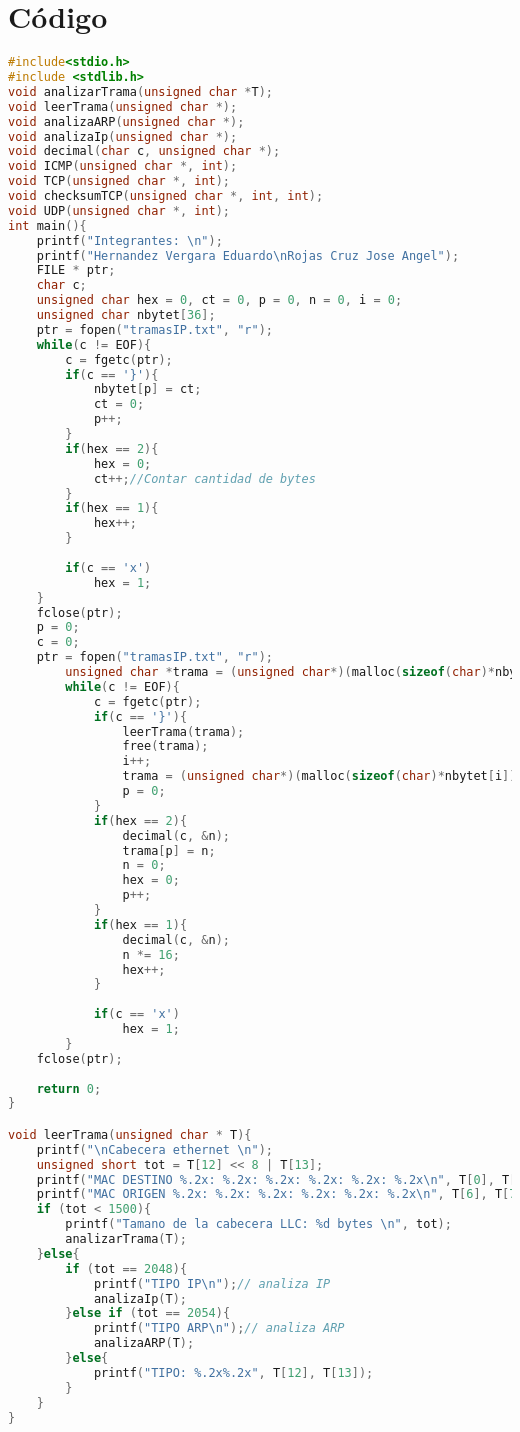 \section{C\'odigo}
	\begin{lstlisting}[language={C}, caption={Analizador de tramas en C}, label={Script}]
#include<stdio.h>
#include <stdlib.h>
void analizarTrama(unsigned char *T);
void leerTrama(unsigned char *);
void analizaARP(unsigned char *);
void analizaIp(unsigned char *);
void decimal(char c, unsigned char *);
void ICMP(unsigned char *, int);
void TCP(unsigned char *, int);
void checksumTCP(unsigned char *, int, int);
void UDP(unsigned char *, int);
int main(){
	printf("Integrantes: \n");
	printf("Hernandez Vergara Eduardo\nRojas Cruz Jose Angel");
    FILE * ptr;
    char c;
	unsigned char hex = 0, ct = 0, p = 0, n = 0, i = 0;
	unsigned char nbytet[36];
	ptr = fopen("tramasIP.txt", "r");
    while(c != EOF){
		c = fgetc(ptr);
		if(c == '}'){
			nbytet[p] = ct;
			ct = 0;
			p++;
		}
		if(hex == 2){
			hex = 0;
			ct++;//Contar cantidad de bytes
		}
		if(hex == 1){
			hex++;
		}
			
		if(c == 'x')
			hex = 1;
	}
	fclose(ptr);
	p = 0;
	c = 0;
	ptr = fopen("tramasIP.txt", "r");
		unsigned char *trama = (unsigned char*)(malloc(sizeof(char)*nbytet[0]));
		while(c != EOF){
			c = fgetc(ptr);
			if(c == '}'){
                leerTrama(trama);
                free(trama);
                i++;
                trama = (unsigned char*)(malloc(sizeof(char)*nbytet[i]));
				p = 0;
			}	
			if(hex == 2){
				decimal(c, &n);
				trama[p] = n;
				n = 0;
				hex = 0;
				p++;
			}
			if(hex == 1){
				decimal(c, &n);
				n *= 16;
				hex++;
			}
				
			if(c == 'x')
				hex = 1;
		}
	fclose(ptr);
    
    return 0;
}

void leerTrama(unsigned char * T){
    printf("\nCabecera ethernet \n");
    unsigned short tot = T[12] << 8 | T[13];
    printf("MAC DESTINO %.2x: %.2x: %.2x: %.2x: %.2x: %.2x\n", T[0], T[1], T[2], T[3], T[4], T[5]);
    printf("MAC ORIGEN %.2x: %.2x: %.2x: %.2x: %.2x: %.2x\n", T[6], T[7], T[8], T[9], T[10], T[11]);
    if (tot < 1500){
        printf("Tamano de la cabecera LLC: %d bytes \n", tot);
        analizarTrama(T);
    }else{
        if (tot == 2048){
            printf("TIPO IP\n");// analiza IP
            analizaIp(T);
        }else if (tot == 2054){
            printf("TIPO ARP\n");// analiza ARP
            analizaARP(T);
        }else{
            printf("TIPO: %.2x%.2x", T[12], T[13]);
        }
    }
}


\end{lstlisting}

